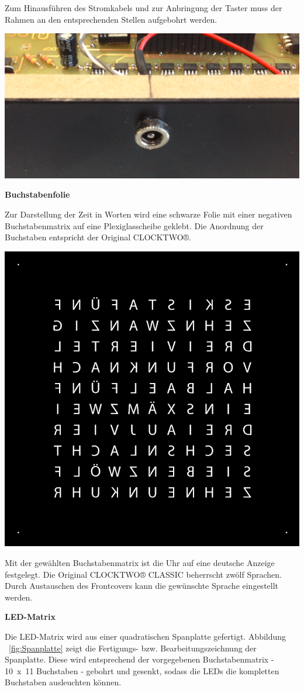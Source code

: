 \begin{multicols}{2}
{}
Zum Hinausführen des Stromkabels und zur Anbringung der Taster muss der Rahmen an den entsprechenden Stellen aufgebohrt werden. 

{
\centering \includegraphics[width=0.5\columnwidth]{Abbildungen/Konstruktion/Stecker01}

}



\textbf{Buchstabenfolie}

Zur Darstellung der Zeit in Worten wird eine schwarze Folie mit einer negativen Buchstabenmatrix auf eine Plexiglasscheibe geklebt. Die Anordnung der Buchstaben entspricht der Original CLOCKTWO®. 

{
\centering\includegraphics[width=0.75\columnwidth]{Abbildungen/Konstruktion/Buchstaben}

}
Mit der gewählten Buchstabenmatrix ist die Uhr auf eine deutsche Anzeige festgelegt. Die Original CLOCKTWO® CLASSIC beherrscht zwölf Sprachen. Durch Austauschen des Frontcovers kann die gewünschte Sprache eingestellt werden. 

\textbf{LED-Matrix}

Die LED-Matrix wird aus einer quadratischen Spanplatte gefertigt. Abbildung ~\ref{fig:Spanplatte} zeigt die Fertigungs- bzw. Bearbeitungszeichnung der Spanplatte. Diese wird entsprechend der vorgegebenen Buchstabenmatrix -  10~x~11 Buchstaben - gebohrt und gesenkt, sodass die LEDs die kompletten Buchstaben ausleuchten können. 


\end{multicols}
